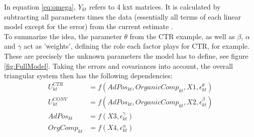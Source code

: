 In equation \ref{eq:omega}, $Y_{kt}$ refers to 4 kxt matrices. It is calculated by subtracting all parameters times the data (essentially all terms of each linear model except for the error) from the current estimate \citep[appendix p. 3]{agarwal_organic_2015}.\\
To summarize the idea, the parameter $\theta$ from the CTR example, as well as $\beta$, $\alpha$ and $\gamma$ act as 'weights', defining the role each factor plays for CTR, for example. These are precisely the unknown parameters the model has to define, see figure \ref{fig:FullModel}. Taking the errors and covariances into account, the overall triangular system then has the following dependencies:
\begin{equation}
    \begin{array}{ll} \label{eq:dependencies}
        U^{CTR}_{kt} &= f(AdPos_{kt}, OrganicComp_{kt}, X1, \epsilon^{\theta}_{kt})\\
        U^{CONV}_{kt} &= f(AdPos_{kt}, OrganicComp_{kt}, X2, \epsilon^{\beta}_{kt})\\
        AdPos_{kt} &= f(X3, \epsilon^{\gamma}_{kt})\\
        OrgComp_{kt} &= f(X4, \epsilon^{\alpha}_{kt})
    \end{array}
\end{equation}

